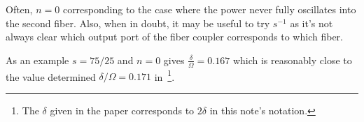 \documentclass[fontsize=12pt,paper=usletter,open=any,
  twoside=no,toc=listof,toc=bibliography,
  captions=nooneline,captions=tableabove,english,DIV=calc,numbers=noenddot,final,parskip=full,
  headinclude=true,footinclude=false,BCOR=0mm,heading=normal]{scrartcl}
\begin{document}
Often, \(n=0\) corresponding to the case where the power never fully
oscillates into the second fiber. Also, when in doubt, it may be
useful to try \(s^{-1}\) as it's not always clear which output port of
the fiber coupler corresponds to which fiber.

As an example \(s=75/25\) and \(n=0\) gives \(\frac{δ}{Ω} = 0.167\)
which is reasonably close to the value determined \(δ/Ω = 0.171\)
in~\cite{Pellerin2023}\footnote{The \(δ\) given in the paper
  corresponds to \(2δ\) in this note's notation.}.

\printbibliography
\printindex
\end{document}
